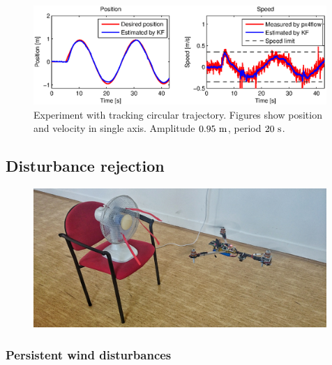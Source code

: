 \begin{figure}[H]
\centering
\includegraphics[width=0.99\textwidth]{fig/experiment1_sine.eps}
\caption{Experiment with tracking circular trajectory. Figures show position and velocity in single axis. Amplitude $0.95~\mathrm{m}$, period $20~\mathrm{s}$.}
\label{fig:experiment_sine_1}
\end{figure}

\subsection{Disturbance rejection}

\begin{figure}[H]
\centering
\includegraphics[width=0.99\textwidth]{fig/disturbance.jpg}
\caption{}
\label{fig:vetrak1}
\end{figure}

\subsubsection{Persistent wind disturbances}


